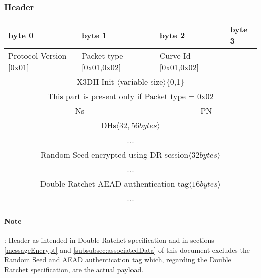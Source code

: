 \documentclass[a4paper,11pt]{article}
\begin{document}
      \subsubsection{Header}
      \label{subsubsec:protocol_doubleratchet_header}
      \begin{center}
      \begin{tabular}{ | p{1.4in} | p{1.4in} | p{1.4in} | p{1.4in} |}
        \hline
        \cellcolor[gray]{0.85} byte 0 & \cellcolor[gray]{0.85} byte 1 & \cellcolor[gray]{0.85} byte 2 & \cellcolor[gray]{0.85}byte 3\\
        \hline
        Protocol Version [0x01] & Packet type [0x01,0x02] & Curve Id [0x01,0x02] & \\
        \cline{1-3}
        \multicolumn{4}{|c|}{X3DH Init $\langle $variable size$\rangle $\{0,1\}}\\
        \multicolumn{4}{|c|}{This part is present only if Packet type = 0x02}\\
        \hline
        \multicolumn{2}{|c}{Ns}&\multicolumn{2}{|c|}{PN}\\
        \hline
        \multicolumn{4}{|c|}{DHs$\langle 32,56 bytes\rangle $}\\
        \multicolumn{4}{|c|}{...}\\
        \hline
        \multicolumn{4}{|c|}{Random Seed encrypted using DR session$\langle 32bytes\rangle $}\\
        \multicolumn{4}{|c|}{...}\\
        \hline
        \multicolumn{4}{|c|}{Double Ratchet AEAD authentication tag$\langle 16bytes\rangle $}\\
        \multicolumn{4}{|c|}{...}\\
        \hline
      \end{tabular}
      \end{center}
      \paragraph{Note}: Header as intended in Double Ratchet specification \cite{doubleRatchet} and in sections \ref{messageEncrypt} and \ref{subsubsec:associatedData} of this document excludes the Random Seed and AEAD authentication tag which, regarding the Double Ratchet specification, are the actual payload.
      
\end{document}
